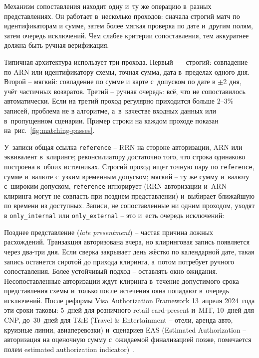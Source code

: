 Механизм сопоставления находит одну и~ту же
операцию в~разных представлениях. Он работает в~несколько проходов:
сначала строгий матч по идентификаторам и сумме, затем более мягкая
проверка по дате и~другим полям, затем очередь исключений. Чем
слабее критерии сопоставления, тем аккуратнее должна быть ручная
верификация.

Типичная архитектура использует три прохода. Первый~--- строгий:
совпадение по ARN или идентификатору схемы, точная сумма, дата
в~пределах одного дня. Второй -- мягкий: совпадение по сумме и
карте с~допуском по дате в $\pm$2 дня, учёт частичных возвратов.
Третий -- ручная очередь: всё, что не сопоставилось автоматически.
Если на третий проход регулярно приходится больше 2--3\% записей,
проблема не в алгоритме, а~в~качестве входных данных или
в~пропущенном сценарии. Пример строки на каждом проходе показан на~рис.~\ref{fig:matching-passes}.

У~записи общая ссылка \texttt{reference} -- RRN на стороне авторизации,
ARN или эквивалент в~клиринге; реконсилиатору достаточно того, что строка
одинаково построена в~обоих источниках. Строгий проход ищет точную
пару по \texttt{reference}, сумме и~валюте с~узким временным
допуском; мягкий -- ту же сумму и~валюту с~широким допуском,
\texttt{reference} игнорирует (RRN авторизации и~ARN клиринга могут
не совпасть при позднем представлении) и~выбирает ближайшую
по времени из доступных. Записи, не сопоставленные ни одним проходом,
уходят в \texttt{only\_internal} или \texttt{only\_external} --
это и~есть очередь исключений:


Позднее представление (\textit{late presentment}) -- частая причина ложных
расхождений. Транзакция авторизована вчера, но клиринговая запись
появляется через два-три дня. Если сверка закрывает день жёстко
по календарной дате, такая запись останется сиротой до прихода
клиринга, а~потом потребует ручного сопоставления. Более устойчивый
подход -- оставлять окно ожидания. Несопоставленные авторизации
ждут клиринга в~течение допустимого срока представления схемы
и~только после истечения окна попадают в~очередь исключений.
После реформы Visa Authorization Framework 13~апреля 2024~года эти
сроки таковы: 5~дней для розничного retail card-present и~MIT, 10~дней
для CNP, до~30~дней для T\&E (Travel \& Entertainment -- отели,
аренда авто, круизные линии, авиаперевозки) и~сценариев EAS (Estimated
Authorization -- авторизация на оценочную сумму с~ожидаемой
финализацией позже, помечается полем estimated authorization
indicator)~\cite{visa-core-rules,mc-tpr}.

